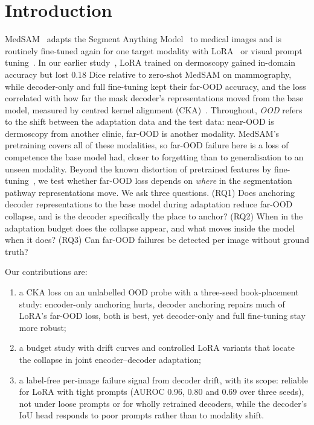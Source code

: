 \section{Introduction}
\label{sec:intro}

MedSAM~\cite{ma2024medsam} adapts the Segment Anything Model~\cite{kirillov2023sam} to medical images and is routinely fine-tuned again for one target modality with LoRA~\cite{hu2022lora} or visual prompt tuning~\cite{jia2022vpt}. In our earlier study~\cite{prior2026safer}, LoRA trained on dermoscopy gained in-domain accuracy but lost 0.18 Dice relative to zero-shot MedSAM on mammography, while decoder-only and full fine-tuning kept their far-OOD accuracy, and the loss correlated with how far the mask decoder's representations moved from the base model, measured by centred kernel alignment (CKA)~\cite{kornblith2019cka}. Throughout, \emph{OOD} refers to the shift between the adaptation data and the test data: near-OOD is dermoscopy from another clinic, far-OOD is another modality. MedSAM's pretraining covers all of these modalities, so far-OOD failure here is a loss of competence the base model had, closer to forgetting than to generalisation to an unseen modality. Beyond the known distortion of pretrained features by fine-tuning~\cite{kumar2022finetuning,tan2024protection}, we test whether far-OOD loss depends on \emph{where} in the segmentation pathway representations move. We ask three questions. (RQ1) Does anchoring decoder representations to the base model during adaptation reduce far-OOD collapse, and is the decoder specifically the place to anchor? (RQ2) When in the adaptation budget does the collapse appear, and what moves inside the model when it does? (RQ3) Can far-OOD failures be detected per image without ground truth?

Our contributions are:
\begin{enumerate}
  \item a CKA loss on an unlabelled OOD probe with a three-seed hook-placement study: encoder-only anchoring hurts, decoder anchoring repairs much of LoRA's far-OOD loss, both is best, yet decoder-only and full fine-tuning stay more robust;
  \item a budget study with drift curves and controlled LoRA variants that locate the collapse in joint encoder--decoder adaptation;
  \item a label-free per-image failure signal from decoder drift, with its scope: reliable for LoRA with tight prompts (AUROC 0.96, 0.80 and 0.69 over three seeds), not under loose prompts or for wholly retrained decoders, while the decoder's IoU head responds to poor prompts rather than to modality shift.
\end{enumerate}
